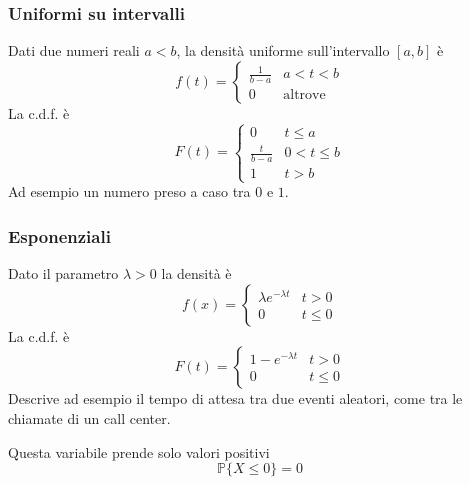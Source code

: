 \subsubsection{Uniformi su intervalli}
Dati due numeri reali $a < b$, la densità uniforme sull'intervallo $[a,b]$ è
\begin{equation}
	f(t) = \begin{cases}
		\frac{1}{b-a} & a < t < b\\
		0 & \text{altrove}
	\end{cases}
\end{equation}
La c.d.f. è
\begin{equation}
	F(t)=\begin{cases}
		0 & t \leq a \\
		\frac{t}{b-a} & 0 < t \leq b \\
		1 & t>b
	\end{cases}
\end{equation}
Ad esempio un numero preso a caso tra $0$ e $1$.

\subsubsection{Esponenziali}
Dato il parametro $\lambda>0$ la densità è
\begin{equation}
	f(x)=\begin{cases}
		\lambda e^{-\lambda t} & t >0 \\
		0 & t \leq 0
	\end{cases}
\end{equation}
La c.d.f. è
\begin{equation}
	F(t) = \begin{cases}
		1-e^{-\lambda t} & t>0\\
		0 & t \leq 0
	\end{cases}
\end{equation}
Descrive ad esempio il tempo di attesa tra due eventi aleatori, come tra le chiamate di un call center.
\begin{observation}
	Questa variabile prende solo valori positivi
	\begin{equation*}
		\mathbb{P}\{X \leq 0\}= 0
	\end{equation*}
\end{observation}


